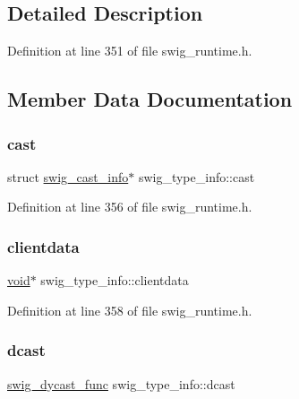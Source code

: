 \subsection{Detailed Description}


Definition at line 351 of file swig\+\_\+runtime.\+h.



\subsection{Member Data Documentation}
\mbox{\label{structswig__type__info_a3ee3f7ef20e965b6c798d79723a96f9b}} 
\subsubsection{\texorpdfstring{cast}{cast}}
{\footnotesize\ttfamily struct \mbox{\hyperlink{structswig__cast__info}{swig\+\_\+cast\+\_\+info}}$\ast$ swig\+\_\+type\+\_\+info\+::cast}



Definition at line 356 of file swig\+\_\+runtime.\+h.

\mbox{\label{structswig__type__info_a19bdd65dceb89cd54befd3ded06558b7}} 
\subsubsection{\texorpdfstring{clientdata}{clientdata}}
{\footnotesize\ttfamily \mbox{\hyperlink{_thread_8h_af1e856da2e658414cb2456cb6f7ebc66}{void}}$\ast$ swig\+\_\+type\+\_\+info\+::clientdata}



Definition at line 358 of file swig\+\_\+runtime.\+h.

\mbox{\label{structswig__type__info_a07df4bedf85be77b23756b531b60e0dd}} 
\subsubsection{\texorpdfstring{dcast}{dcast}}
{\footnotesize\ttfamily \mbox{\hyperlink{swig__runtime_8h_aee981c41d733723d60337a77630106af}{swig\+\_\+dycast\+\_\+func}} swig\+\_\+type\+\_\+info\+::dcast}



